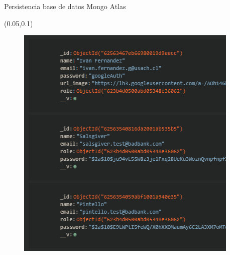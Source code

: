 \documentclass[xcolor=pdftex,dvipsnames,table]{beamer}
\begin{document}
\begin{frame}{Persistencia base de datos Mongo Atlas}
\footnotesize {
    \begin{textblock*}{0.45\textwidth}(0.05\textwidth,0.1\textwidth)
    \begin{figure}[htb]
        \centering
        \captionsetup{justification=centering,margin=0.3cm}
        \includegraphics[width=1\linewidth]{func/basedatros.png} 
    \end{figure}
    \end{textblock*}
    
}
\end{frame}
\end{document}
